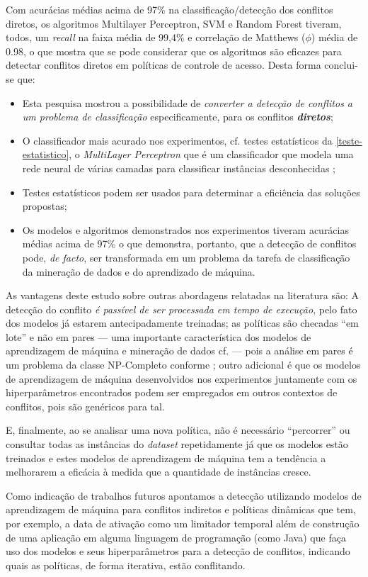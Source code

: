 Com  acurácias médias acima de 97\% na classificação/detecção dos conflitos diretos, os algoritmos Multilayer Perceptron, SVM e Random Forest tiveram, todos, um \textit{recall} na faixa média de 99,4\%  e correlação de Matthews ($\phi$) média de 0.98, o que mostra que se pode considerar que os algoritmos são eficazes para detectar conflitos diretos em políticas de controle de acesso. Desta forma conclui-se que:
\begin{itemize}
	\item Esta pesquisa mostrou a possibilidade de \textit{converter a detecção de conflitos a um problema de classificação} especificamente, para os conflitos \textbf{\textit{diretos}};
	\item O classificador mais acurado nos experimentos, cf. testes estatísticos da \autoref{teste-estatistico}, o \textit{MultiLayer Perceptron} que é um classificador que modela uma rede neural de várias camadas para classificar instâncias desconhecidas \cite{eibe2016};
	\item Testes estatísticos podem ser usados para determinar a eficiência das soluções propostas;
	\item Os modelos e algoritmos demonstrados nos experimentos tiveram acurácias médias acima de 97\% o que demonstra, portanto, que a detecção de conflitos pode, \textit{de facto}, ser transformada em um problema da tarefa de classificação da mineração de dados e do aprendizado de máquina.
\end{itemize}

As vantagens deste estudo sobre outras abordagens relatadas na literatura são: A detecção do conflito \textit{é passível de ser processada em tempo de execução}, pelo fato dos modelos já estarem antecipadamente treinadas; as políticas são checadas ``em lote'' e não em pares --- uma importante característica dos modelos de aprendizagem de máquina e mineração de dados cf.  --- pois a análise em pares é um problema da classe NP-Completo conforme ; outro adicional é que os modelos de aprendizagem de máquina desenvolvidos nos experimentos juntamente com os hiperparâmetros encontrados podem ser empregados em outros contextos de conflitos, pois são genéricos para tal.

E, finalmente, ao se analisar uma nova política, não é necessário ``percorrer'' ou consultar todas as instâncias do \textit{dataset} repetidamente já que os modelos estão treinados e estes modelos de aprendizagem de máquina tem a tendência a melhorarem a eficácia à medida que a quantidade de instâncias cresce.

Como indicação de trabalhos futuros apontamos a detecção utilizando modelos de aprendizagem de máquina para conflitos indiretos e políticas dinâmicas que tem, por exemplo, a data de ativação como um limitador temporal além de construção de uma aplicação em alguma linguagem de programação (como Java) que faça uso dos modelos e seus hiperparâmetros para a detecção de conflitos, indicando quais as políticas, de forma iterativa, estão conflitando.